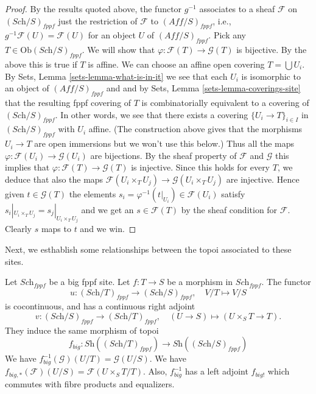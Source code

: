 \begin{proof}
\medskip\noindent
By the results quoted above,
the functor $g^{-1}$ associates to a sheaf $\mathcal{F}$ on
$(\textit{Sch}/S)_{fppf}$ just the restriction of $\mathcal{F}$
to $(\textit{Aff}/S)_{fppf}$, i.e., $g^{-1}\mathcal{F}(U) = \mathcal{F}(U)$
for an object $U$ of $(\textit{Aff}/S)_{fppf}$. Pick any
$T \in \text{Ob}(\textit{Sch}/S)_{fppf}$. We will show that
$\varphi : \mathcal{F}(T) \to \mathcal{G}(T)$ is bijective.
By the above this is true if $T$ is affine.
We can choose an affine open covering $T = \bigcup U_i$. By
Sets, Lemma \ref{sets-lemma-what-is-in-it} we see that
each $U_i$ is isomorphic to an object of $(\textit{Aff}/S)_{fppf}$
and and by Sets, Lemma \ref{sets-lemma-coverings-site}
that the resulting fppf covering of $T$ is combinatorially
equivalent to a covering of $(\textit{Sch}/S)_{fppf}$.
In other words, we see that there exists a covering
$\{U_i \to T\}_{i \in I}$ in $(\textit{Sch}/S)_{fppf}$ with $U_i$ affine.
(The construction above gives that the morphisms $U_i \to T$ are open
immersions but we won't use this below.)
Thus all the maps $\varphi : \mathcal{F}(U_i) \to \mathcal{G}(U_i)$
are bijections. By the sheaf property of $\mathcal{F}$ and $\mathcal{G}$
this implies that $\varphi : \mathcal{F}(T) \to \mathcal{G}(T)$ is injective.
Since this holds for every $T$, we deduce that also the maps
$\mathcal{F}(U_i \times_T U_j) \to \mathcal{G}(U_i \times_T U_j)$
are injective. Hence given $t \in \mathcal{G}(T)$
the elements $s_i = \varphi^{-1}(t|_{U_i}) \in \mathcal{F}(U_i)$
satisfy $s_i|_{U_i \times_T U_j} = s_j|_{U_i \times_T U_j}$
and we get an $s \in \mathcal{F}(T)$ by the sheaf condition
for $\mathcal{F}$. Clearly $s$ maps to $t$ and we win.
\end{proof}

\noindent
Next, we esthablish some relationships between the topoi
associated to these sites.

\begin{lemma}
\label{lemma-morphism-big-fppf}
Let $\textit{Sch}_{fppf}$ be a big fppf site.
Let $f : T \to S$ be a morphism in $\textit{Sch}_{fppf}$.
The functor
$$
u : (\textit{Sch}/T)_{fppf} \longrightarrow (\textit{Sch}/S)_{fppf},
\quad
V/T \longmapsto V/S
$$
is cocontinuous, and has a continuous right adjoint
$$
v : (\textit{Sch}/S)_{fppf} \longrightarrow (\textit{Sch}/T)_{fppf},
\quad
(U \to S) \longmapsto (U \times_S T \to T).
$$
They induce the same morphism of topoi
$$
f_{big} :
\textit{Sh}((\textit{Sch}/T)_{fppf})
\longrightarrow
\textit{Sh}((\textit{Sch}/S)_{fppf})
$$
We have $f_{big}^{-1}(\mathcal{G})(U/T) = \mathcal{G}(U/S)$.
We have $f_{big, *}(\mathcal{F})(U/S) = \mathcal{F}(U\times_ST/T)$.
Also, $f_{big}^{-1}$ has a left adjoint $f_{big!}$ which commutes with
fibre products and equalizers.
\end{lemma}

